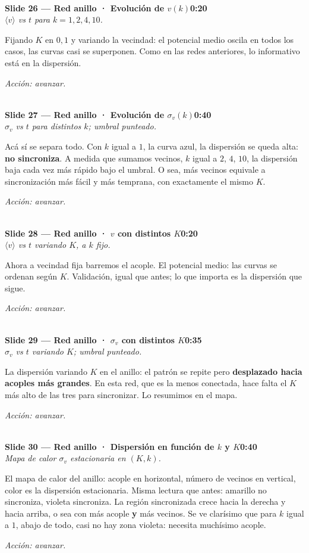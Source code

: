 \documentclass[11pt]{article}
\newcommand{\slide}[3]{%
  \vspace{6pt}%
  \noindent{\color{azulOscuro}\rule{3.2cm}{2pt}}\\[2pt]
  \noindent\textbf{\color{azulOscuro}#1}\hfill\textbf{\color{azulMedio}#3}\\[-2pt]
  {\small\color{grisTexto}\itshape #2}\\[2pt]
}
\begin{document}
\slide{Slide 26 — Red anillo · Evolución de $v(k)$}{$\langle v\rangle$ vs $t$ para $k=1,2,4,10$.}{0:20}
\begin{guion}
Fijando $K$ en $0{,}1$ y variando la vecindad: el potencial medio oscila en todos los casos, las curvas casi se superponen. Como en las redes anteriores, lo informativo está en la dispersión.
\end{guion}
\textit{Acción: avanzar.}

\slide{Slide 27 — Red anillo · Evolución de $\sigma_v(k)$}{$\sigma_v$ vs $t$ para distintos $k$; umbral punteado.}{0:40}
\begin{guion}
Acá sí se separa todo. Con $k$ igual a $1$, la curva azul, la dispersión se queda alta: \textbf{no sincroniza}. A medida que sumamos vecinos, $k$ igual a $2$, $4$, $10$, la dispersión baja cada vez más rápido bajo el umbral. O sea, más vecinos equivale a sincronización más fácil y más temprana, con exactamente el mismo $K$.
\end{guion}
\textit{Acción: avanzar.}

\slide{Slide 28 — Red anillo · $v$ con distintos $K$}{$\langle v\rangle$ vs $t$ variando $K$, a $k$ fijo.}{0:20}
\begin{guion}
Ahora a vecindad fija barremos el acople. El potencial medio: las curvas se ordenan según $K$. Validación, igual que antes; lo que importa es la dispersión que sigue.
\end{guion}
\textit{Acción: avanzar.}

\slide{Slide 29 — Red anillo · $\sigma_v$ con distintos $K$}{$\sigma_v$ vs $t$ variando $K$; umbral punteado.}{0:35}
\begin{guion}
La dispersión variando $K$ en el anillo: el patrón se repite pero \textbf{desplazado hacia acoples más grandes}. En esta red, que es la menos conectada, hace falta el $K$ más alto de las tres para sincronizar. Lo resumimos en el mapa.
\end{guion}
\textit{Acción: avanzar.}

\slide{Slide 30 — Red anillo · Dispersión en función de $k$ y $K$}{Mapa de calor $\sigma_v$ estacionaria en $(K,k)$.}{0:40}
\begin{guion}
El mapa de calor del anillo: acople en horizontal, número de vecinos en vertical, color es la dispersión estacionaria. Misma lectura que antes: amarillo no sincroniza, violeta sincroniza. La región sincronizada crece hacia la derecha y hacia arriba, o sea con más acople \textbf{y} más vecinos. Se ve clarísimo que para $k$ igual a $1$, abajo de todo, casi no hay zona violeta: necesita muchísimo acople.
\end{guion}
\textit{Acción: avanzar.}
\end{document}
